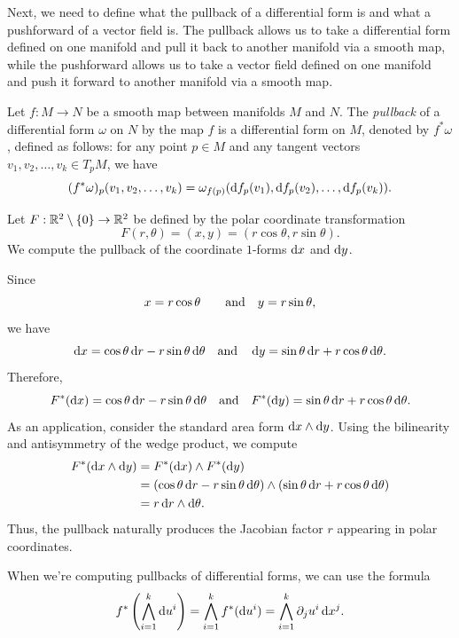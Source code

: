 Next, we need to define what the pullback of a differential form is and what a pushforward of a vector field is. The pullback allows us to take a differential form defined on one manifold and pull it back to another manifold via a smooth map, while the pushforward allows us to take a vector field defined on one manifold and push it forward to another manifold via a smooth map.

\begin{definition}
  Let $f : M \to N$ be a smooth map between manifolds $M$ and $N$. The \emph{pullback} of a differential form $\omega$ on $N$ by the map $f$ is a differential form on $M$, denoted by $f^*\omega$, defined as follows: for any point $p \in M$ and any tangent vectors $v_1, v_2, \ldots, v_k \in T_pM$, we have
  \[%
    (f^*\omega)_p(v_1, v_2, \ldots, v_k) = \omega_{f(p)}(\df_p(v_1), \df_p(v_2), \ldots, \df_p(v_k))
  .\]%
\end{definition}

\begin{example}
  Let $F : \mathbb{R}^2 \setminus \{0\} \rightarrow \mathbb{R}^2$ be defined by the polar coordinate transformation
  \[%
    F(r,\theta) = (x,y) = (r\cos\theta, r\sin\theta)
  .\]%
  We compute the pullback of the coordinate $1$-forms $\dx$ and $\dy$.

  Since
  \[%
    x = r\cos\theta \quad \aand y = r\sin\theta
  ,\]%
  we have
  \[%
    \dx = \cos\theta \dr - r\sin\theta \dd{\theta} \aand \dy = \sin\theta \dr + r\cos\theta \dd{\theta}
  .\]%
  Therefore,
  \[%
    F^*(\dx) = \cos\theta \dr - r\sin\theta \dd{\theta} \aand F^*(\dy) = \sin\theta \dr + r\cos\theta \dd{\theta}
  .\]%
  As an application, consider the standard area form $\dx \wedge \dy$. Using the bilinearity and antisymmetry of the wedge product, we compute
  \begin{align*}
    F^*(\dx \wedge \dy) &= F^*(\dx) \wedge F^*(\dy) \\
                      &= (\cos\theta \dr - r\sin\theta \dd{\theta}) \wedge (\sin\theta \dr + r\cos\theta \dd{\theta}) \\
                      &= r \dr \wedge \dd{\theta}.
  \end{align*}
  Thus, the pullback naturally produces the Jacobian factor $r$ appearing in polar coordinates.
\end{example}

When we're computing pullbacks of differential forms, we can use the formula
\[%
  f^*\left(\bigwedge_{i=1}^k \du^i\right) = \bigwedge_{i=1}^k f^*(\du^i) = \bigwedge_{i=1}^k \pd{j} u^i \dx^j
.\]%

